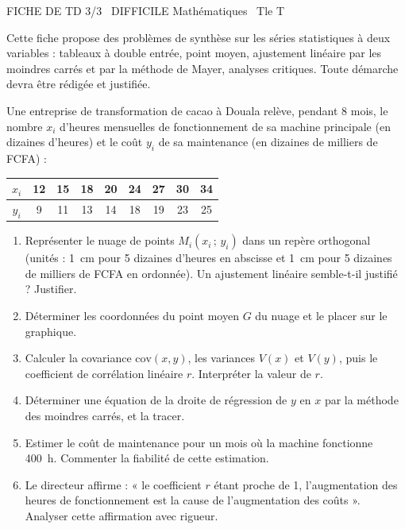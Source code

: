 \documentclass[11pt]{article}
\begin{document}
\begin{tcolorbox}[enhanced,colback=popink,colframe=popink,arc=10pt,boxrule=0pt,left=12pt,right=12pt,top=9pt,bottom=9pt]
{\color{white}\popxbold\small FICHE DE TD 3/3 \textbullet\ DIFFICILE \hfill Mathématiques \textbullet\ Tle T\par}
\end{tcolorbox}
\vspace{4pt}
Cette fiche propose des problèmes de synthèse sur les séries statistiques à deux variables : tableaux à double entrée, point moyen, ajustement linéaire par les moindres carrés et par la méthode de Mayer, analyses critiques. Toute démarche devra être rédigée et justifiée.

\begin{exercice}
Une entreprise de transformation de cacao à Douala relève, pendant 8 mois, le nombre $x_i$ d'heures mensuelles de fonctionnement de sa machine principale (en dizaines d'heures) et le coût $y_i$ de sa maintenance (en dizaines de milliers de FCFA) :

\begin{center}
\begin{tabular}{|c|c|c|c|c|c|c|c|c|}
\hline
$x_i$ & 12 & 15 & 18 & 20 & 24 & 27 & 30 & 34 \\
\hline
$y_i$ & 9 & 11 & 13 & 14 & 18 & 19 & 23 & 25 \\
\hline
\end{tabular}
\end{center}

\begin{enumerate}
\item Représenter le nuage de points $M_i(x_i\,;\,y_i)$ dans un repère orthogonal (unités : \SI{1}{cm} pour 5 dizaines d'heures en abscisse et \SI{1}{cm} pour 5 dizaines de milliers de FCFA en ordonnée). Un ajustement linéaire semble-t-il justifié ? Justifier.
\item Déterminer les coordonnées du point moyen $G$ du nuage et le placer sur le graphique.
\item Calculer la covariance $\mathrm{cov}(x,y)$, les variances $V(x)$ et $V(y)$, puis le coefficient de corrélation linéaire $r$. Interpréter la valeur de $r$.
\item Déterminer une équation de la droite de régression de $y$ en $x$ par la méthode des moindres carrés, et la tracer.
\item Estimer le coût de maintenance pour un mois où la machine fonctionne \SI{400}{h}. Commenter la fiabilité de cette estimation.
\item Le directeur affirme : « le coefficient $r$ étant proche de 1, l'augmentation des heures de fonctionnement est la cause de l'augmentation des coûts ». Analyser cette affirmation avec rigueur.
\end{enumerate}
\end{exercice}
\end{document}
